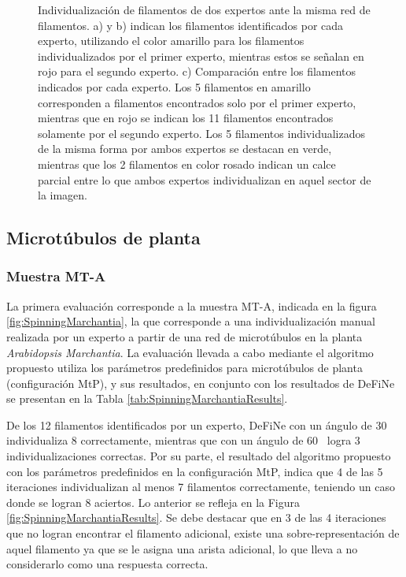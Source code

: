 \begin{figure}[h!]
\begin{subfigure}[t]{0.3\textwidth}
        \label{fig:slice6-spinning-both-gtruth}
    \end{subfigure}
    \caption[Individualizaci\'on de dos expertos ante la misma red de filamentos]{Individualizaci\'on de filamentos de dos expertos ante la misma red de filamentos. a) y b) indican los filamentos identificados por cada experto, utilizando el color amarillo para los filamentos individualizados por el primer experto, mientras estos se se\~nalan en rojo para el segundo experto. c) Comparaci\'on entre los filamentos indicados por cada experto. Los 5 filamentos en amarillo corresponden a filamentos encontrados solo por el primer experto, mientras que en rojo se indican los 11 filamentos encontrados solamente por el segundo experto. Los 5 filamentos individualizados de la misma forma por ambos expertos se destacan en verde, mientras que los 2 filamentos en color rosado indican un calce parcial entre lo que ambos expertos individualizan en aquel sector de la imagen.}
    \label{fig:experts-compared-slice6-spinning}
\end{figure}

\subsection{Microt\'ubulos de planta}
\label{subsec:mtTest}

\subsubsection{Muestra MT-A}
La primera evaluaci\'on corresponde a la muestra MT-A, indicada en la figura \ref{fig:SpinningMarchantia}, la que corresponde a una individualizaci\'on manual realizada por un experto a partir de una red de microt\'ubulos en la planta {\it Arabidopsis Marchantia}. La evaluaci\'on llevada a cabo mediante el algoritmo propuesto utiliza los par\'ametros predefinidos para microt\'ubulos de planta (configuraci\'on MtP), y sus resultados, en conjunto con los resultados de DeFiNe se presentan en la Tabla \ref{tab:SpinningMarchantiaResults}.

De los 12 filamentos identificados por un experto, DeFiNe con un \'angulo de 30\textdegree~ individualiza 8 correctamente, mientras que con un \'angulo de 60\textdegree~ logra 3 individualizaciones correctas. Por su parte, el resultado del algoritmo propuesto con los par\'ametros predefinidos en la configuraci\'on MtP, indica que 4 de las 5 iteraciones individualizan al menos 7 filamentos correctamente, teniendo un caso donde se logran 8 aciertos. Lo anterior se refleja en la Figura \ref{fig:SpinningMarchantiaResults}. Se debe destacar que en 3 de las 4 iteraciones que no logran encontrar el filamento adicional, existe una sobre-representaci\'on de aquel filamento ya que se le asigna una arista adicional, lo que lleva a no considerarlo como una respuesta correcta. 


